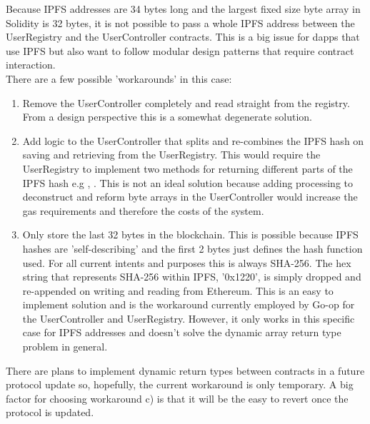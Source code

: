 Because IPFS addresses are 34 bytes long and the largest fixed size byte array in Solidity is 32 bytes, it is not possible to pass a whole IPFS address between the UserRegistry and the UserController contracts. This is a big issue for dapps that use IPFS but also want to follow modular design patterns that require contract interaction. \\

There are a few possible 'workarounds' in this case:\\

\begin{enumerate}[label=(\alph*)]
\item Remove the UserController completely and read straight from the registry. From a design perspective this is a somewhat degenerate solution. \\

\item Add logic to the UserController that splits and re-combines the IPFS hash on saving and retrieving from the UserRegistry. This would require the UserRegistry to implement two methods for returning different parts of the IPFS hash e.g , . This is not an ideal solution because adding processing to deconstruct and reform byte arrays in the UserController would increase the gas requirements and therefore the costs of the system. \\

\item Only store the last 32 bytes in the blockchain. This is possible because IPFS hashes are 'self-describing' and the first 2 bytes just defines the hash function used. For all current intents and purposes this is always SHA-256. The hex string that represents SHA-256 within IPFS, '0x1220', is simply dropped and re-appended on writing and reading from Ethereum. This is an easy to implement solution and is the workaround currently employed by Go-op for the UserController and UserRegistry. However, it only works in this specific case for IPFS addresses and doesn't solve the dynamic array return type problem in general.\\
\end{enumerate}

There are plans to implement dynamic return types between contracts in a future protocol update so, hopefully, the current workaround is only temporary\cite{ReturnArray}. A big factor for choosing workaround c) is that it will be the easy to revert once the protocol is updated.\\

